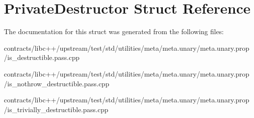 \hypertarget{struct_private_destructor}{}\section{Private\+Destructor Struct Reference}
\label{struct_private_destructor}


The documentation for this struct was generated from the following files\+:\begin{DoxyCompactItemize}
\item 
contracts/libc++/upstream/test/std/utilities/meta/meta.\+unary/meta.\+unary.\+prop/is\+\_\+destructible.\+pass.\+cpp\item 
contracts/libc++/upstream/test/std/utilities/meta/meta.\+unary/meta.\+unary.\+prop/is\+\_\+nothrow\+\_\+destructible.\+pass.\+cpp\item 
contracts/libc++/upstream/test/std/utilities/meta/meta.\+unary/meta.\+unary.\+prop/is\+\_\+trivially\+\_\+destructible.\+pass.\+cpp\end{DoxyCompactItemize}
